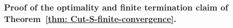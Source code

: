 \documentclass[opre,sglanonrev]{informs4}
\newcommand{\mS}{\mathcal{S}}
\newcommand{\bbeta}{\bm{\beta}}
\newcommand{\bc}{\bm{c}}
\newcommand{\bx}{\bm{x}}
\begin{document}
{%





\subsubsection{\texorpdfstring{Proof of the optimality and finite termination claim of Theorem~\ref{thm: Cut-S-finite-convergence}.}{Proof of the optimality and finite termination claim}}
\label{sec: finite-convergence-proof}

}
\end{document}
